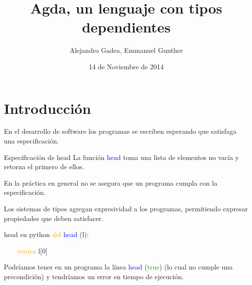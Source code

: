 \documentclass[xcolor=dvipsnames]{beamer} %
\newcommand{\cf}[1]{\textcolor{blue}{#1}}
\newcommand{\cc}[1]{\textcolor{ForestGreen}{#1}}
\newcommand{\ck}[1]{\textcolor{orange}{#1}}
\newcommand{\T}{ \ \ \ \ }
\begin{document}
\beamertemplatenavigationsymbolsempty
\title{Agda, un lenguaje con tipos dependientes}
\author{{Alejandro Gadea, Emmanuel Gunther}\\
\vspace*{0.5cm}}
\date{14 de Noviembre de 2014}
\frame{\titlepage}

\section{Introducción}

\begin{frame}

\begin{block}{ }
 En el desarrollo de software los programas se escriben esperando que
 satisfaga una especificación.
\end{block}

\pause

\begin{exampleblock}{Especificación de head}
 La función \cf{head} toma una lista de elementos no vacía y retorna el primero de ellos.
\end{exampleblock}

\pause

\begin{block}{}
 En la práctica en general no se asegura que un programa cumpla con la especificación.
\end{block}


\end{frame}

\begin{frame}

\begin{block}{ }
 Los sistemas de tipos agregan expresividad a los programas, permitiendo expresar propiedades que deben satisfacer.
\end{block}

\pause

\begin{exampleblock}{head en python}
  \ck{def} \cf{head} (l):
  
  \T \ck{return} l[0]
\end{exampleblock}

\pause

\begin{block}{}
  Podríamos tener en un programa la línea \cf{head} (\cc{true}) (lo cual no cumple una precondición) 
  y tendríamos un error en tiempo de ejecución.
\end{block}

\end{frame}
\end{document}
